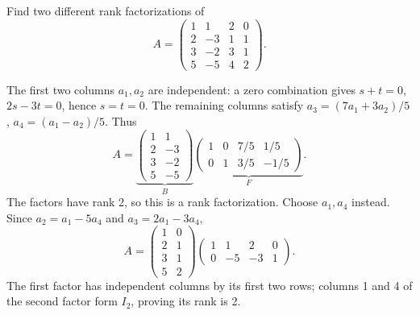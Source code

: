 \begin{problem}\label{ex:03:two-factorizations}
Find two different rank factorizations of
\[
A=\begin{pmatrix}1&1&2&0\\2&-3&1&1\\3&-2&3&1\\5&-5&4&2\end{pmatrix}.
\]
\end{problem}
\begin{solution}
The first two columns \(a_1,a_2\) are independent: a zero combination
gives \(s+t=0\), \(2s-3t=0\), hence \(s=t=0\).
The remaining columns satisfy
\(a_3=(7a_1+3a_2)/5\), \(a_4=(a_1-a_2)/5\). Thus
\[
A=\underbrace{\begin{pmatrix}1&1\\2&-3\\3&-2\\5&-5\end{pmatrix}}_B
\underbrace{\begin{pmatrix}1&0&7/5&1/5\\0&1&3/5&-1/5\end{pmatrix}}_F.
\]
The factors have rank 2, so this is a rank factorization.
Choose \(a_1,a_4\) instead. Since \(a_2=a_1-5a_4\) and
\(a_3=2a_1-3a_4\),
\[
A=\begin{pmatrix}1&0\\2&1\\3&1\\5&2\end{pmatrix}
\begin{pmatrix}1&1&2&0\\0&-5&-3&1\end{pmatrix}.
\]
The first factor has independent columns by its first two rows;
columns 1 and 4 of the second factor form \(I_2\), proving its rank is 2.
\end{solution}

